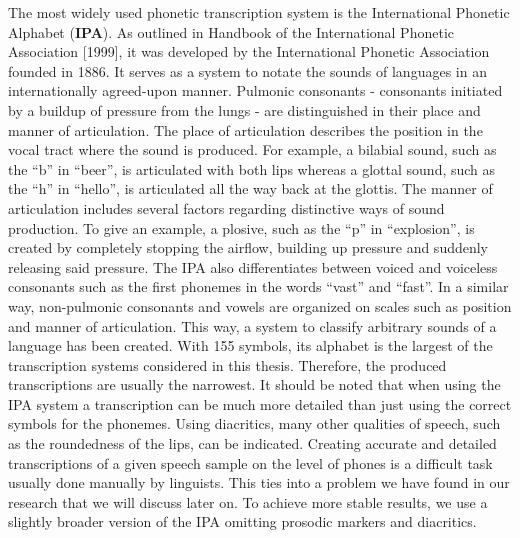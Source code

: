 The most widely used phonetic transcription system is the International Phonetic Alphabet (\textbf{IPA}).
As outlined in Handbook of the International Phonetic Association [1999], it was developed by the International Phonetic Association founded in 1886.
It serves as a system to notate the sounds of languages in an internationally agreed-upon manner.
Pulmonic consonants - consonants initiated by a buildup of pressure from the lungs - are distinguished in their place and manner of articulation.
The place of articulation describes the position in the vocal tract where the sound is produced.
For example, a bilabial sound, such as the ``b'' in ``beer'', is articulated with both lips whereas a glottal sound, such as the ``h'' in ``hello'', is articulated all the way back at the glottis.  %
The manner of articulation includes several factors regarding distinctive ways of sound production.
To give an example, a plosive, such as the ``p'' in ``explosion'', is created by completely stopping the airflow, building up pressure and suddenly releasing said pressure.
The IPA also differentiates between voiced and voiceless consonants such as the first phonemes in the words ``vast'' and ``fast''.
In a similar way, non-pulmonic consonants and vowels are organized on scales such as position and manner of articulation.
This way, a system to classify arbitrary sounds of a language has been created.
With 155 symbols, its alphabet is the largest of the transcription systems considered in this thesis.
Therefore, the produced transcriptions are usually the narrowest.
It should be noted that when using the IPA system a transcription can be much more detailed than just using the correct symbols for the phonemes.
Using diacritics, many other qualities of speech, such as the roundedness of the lips, can be indicated.
Creating accurate and detailed transcriptions of a given speech sample on the level of phones is a difficult task usually done manually by linguists.
This ties into a problem we have found in our research that we will discuss later on.
To achieve more stable results, we use a slightly broader version of the IPA omitting prosodic markers and diacritics.
\\

